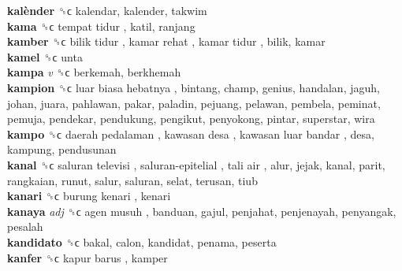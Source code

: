 \textbf{kalènder} ␝ϲ  kalendar, kalender, takwim  \\
\textbf{kama} ␝ϲ   tempat tidur , katil, ranjang  \\
\textbf{kamber} ␝ϲ   bilik tidur ,  kamar rehat ,  kamar tidur , bilik, kamar  \\
\textbf{kamel} ␝ϲ  unta  \\
\textbf{kampa} \emph{v}  ␝ϲ  berkemah, berkhemah  \\
\textbf{kampion} ␝ϲ   luar biasa hebatnya , bintang, champ, genius, handalan, jaguh, johan, juara, pahlawan, pakar, paladin, pejuang, pelawan, pembela, peminat, pemuja, pendekar, pendukung, pengikut, penyokong, pintar, superstar, wira  \\
\textbf{kampo} ␝ϲ   daerah pedalaman ,  kawasan desa ,  kawasan luar bandar , desa, kampung, pendusunan  \\
\textbf{kanal} ␝ϲ   saluran televisi ,  saluran-epitelial ,  tali air , alur, jejak, kanal, parit, rangkaian, runut, salur, saluran, selat, terusan, tiub  \\
\textbf{kanari} ␝ϲ   burung kenari , kenari  \\
\textbf{kanaya} \emph{adj}  ␝ϲ   agen musuh , banduan, gajul, penjahat, penjenayah, penyangak, pesalah  \\
\textbf{kandidato} ␝ϲ  bakal, calon, kandidat, penama, peserta  \\
\textbf{kanfer} ␝ϲ   kapur barus , kamper  \\
